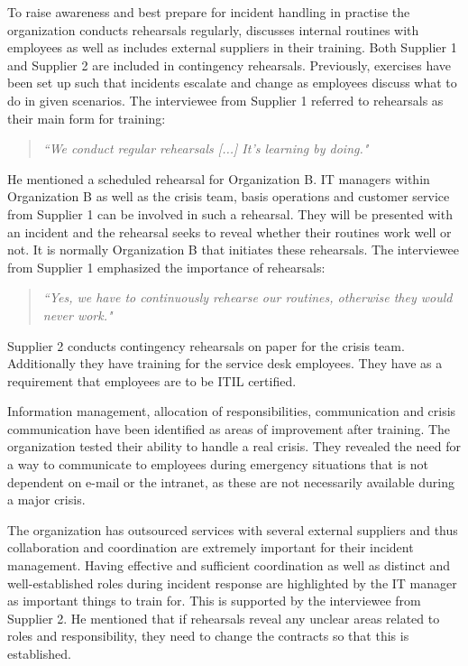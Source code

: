 To raise awareness and best prepare for incident handling in practise the organization conducts rehearsals regularly, discusses internal routines with employees as well as includes external suppliers in their training. Both Supplier 1 and Supplier 2 are included in contingency rehearsals. Previously, exercises have been set up such that incidents escalate and change as employees discuss what to do in given scenarios. The interviewee from Supplier 1 referred to rehearsals as their main form for training:

\begin{quote}
\textit{``We conduct regular rehearsals [...] It's learning by doing."}
\end{quote}

He mentioned a scheduled rehearsal for Organization B. IT managers within Organization B as well as the crisis team, basis operations and customer service from Supplier 1 can be involved in such a rehearsal. They will be presented with an incident and the rehearsal seeks to reveal whether their routines work well or not. It is normally Organization B that initiates these rehearsals. The interviewee from Supplier 1 emphasized the importance of rehearsals:

\begin{quote}
\textit{``Yes, we have to continuously rehearse our routines, otherwise they would never work."}
\end{quote}

Supplier 2 conducts contingency rehearsals on paper for the crisis team. Additionally they have training for the service desk employees. They have as a requirement that employees are to be \ac{ITIL} certified.

Information management, allocation of responsibilities, communication and crisis communication have been identified as areas of improvement after training. The organization tested their ability to handle a real crisis. They revealed the need for a way to communicate to employees during emergency situations that is not dependent on e-mail or the intranet, as these are not necessarily available during a major crisis.

The organization has outsourced services with several external suppliers and thus collaboration and coordination are extremely important for their incident management. Having effective and sufficient coordination as well as distinct and well-established roles during incident response are highlighted by the IT manager as important things to train for. This is supported by the interviewee from Supplier 2. He mentioned that if rehearsals reveal any unclear areas related to roles and responsibility, they need to change the contracts so that this is established.

